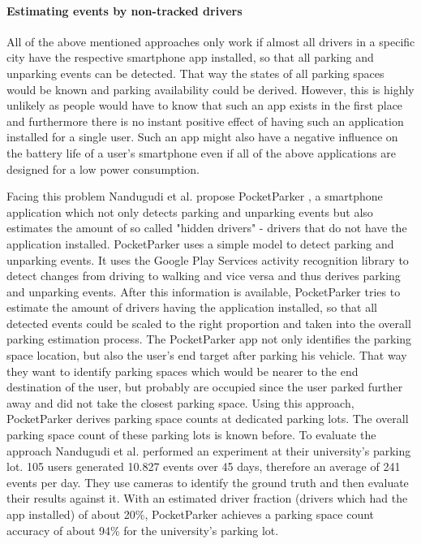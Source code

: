 \paragraph{Estimating events by non-tracked drivers}

All of the above mentioned approaches only work if almost all drivers in a specific city have the respective smartphone app installed, so that all parking and unparking events can be detected. That way the states of all parking spaces would be known and parking availability could be derived. However, this is highly unlikely as people would have to know that such an app exists in the first place and furthermore there is no instant positive effect of having such an application installed for a single user. Such an app might also have a negative influence on the battery life of a user's smartphone even if all of the above applications are designed for a low power consumption.

Facing this problem Nandugudi et al. propose PocketParker \cite{Nandugudi:2014:PPP:2632048.2632098}, a smartphone application which not only detects parking and unparking events but also estimates the amount of so called "hidden drivers" - drivers that do not have the application installed. PocketParker uses a simple model to detect parking and unparking events. It uses the Google Play Services activity recognition library to detect changes from driving to walking and vice versa and thus derives parking and unparking events. After this information is available, PocketParker tries to estimate the amount of drivers having the application installed, so that all detected events could be scaled to the right proportion and taken into the overall parking estimation process. The PocketParker app not only identifies the parking space location, but also the user's end target after parking his vehicle. That way they want to identify parking spaces which would be nearer to the end destination of the user, but probably are occupied since the user parked further away and did not take the closest parking space. Using this approach, PocketParker derives parking space counts at dedicated parking lots. The overall parking space count of these parking lots is known before. To evaluate the approach Nandugudi et al. performed an experiment at their university's parking lot. 105 users generated 10.827 events over 45 days, therefore an average of 241 events per day. They use cameras to identify the ground truth and then evaluate their results against it. With an estimated driver fraction (drivers which had the app installed) of about 20\%, PocketParker achieves a parking space count accuracy of about 94\% for the university's parking lot.


